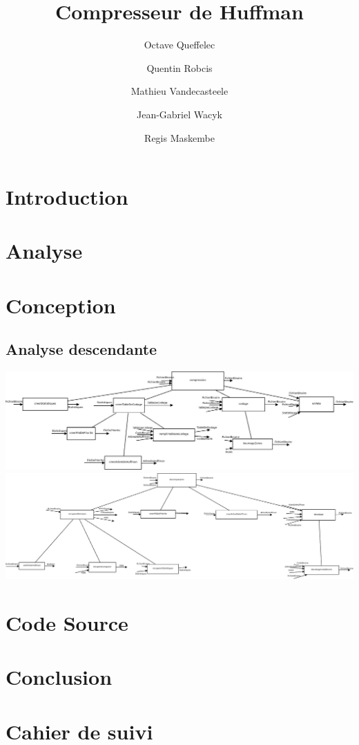 \documentclass{article}
\title{Compresseur de Huffman}
\author{Octave Queffelec \and Quentin Robcis \and Mathieu Vandecasteele \and Jean-Gabriel Wacyk \and Regis Maskembe}
\begin{document}
\maketitle
\newpage


\tableofcontents
\newpage


\section{Introduction}


\newpage
\section{Analyse}


\newpage
\section{Conception}
\subsection{Analyse descendante}
\includegraphics[width=500pt,angle=90, origin=c]{Compression_Analysedescendante.jpeg}
\includegraphics[width=500pt,angle=90, origin=c]{decompression_analyse.jpeg}



\newpage
\section{Code Source}


\newpage
\section{Conclusion}


\newpage
\section{Cahier de suivi}

\end{document}

